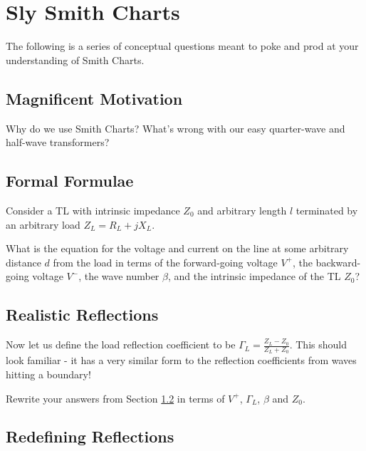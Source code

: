 \documentclass{article}
\begin{document}
\newpage

\section{Sly Smith Charts}
\label{section:smith_chart}

The following is a series of conceptual questions meant to poke and prod at your understanding of Smith Charts.

\subsection{Magnificent Motivation}

Why do we use Smith Charts? What's wrong with our easy quarter-wave and half-wave transformers?

\vspace{3cm}

\subsection{Formal Formulae}
\label{section:formal_formulae}

Consider a TL with intrinsic impedance $Z_0$ and arbitrary length $l$ terminated by an arbitrary load $Z_L = R_L + jX_L$.

What is the equation for the voltage and current on the line at some arbitrary distance $d$ from the load in terms of the forward-going voltage $V^+$, the backward-going voltage $V^-$, the wave number $\beta$, and the intrinsic impedance of the TL $Z_0$?

\vspace{3cm}

\subsection{Realistic Reflections}
\label{section:realistic_reflections}

Now let us define the load reflection coefficient to be $\Gamma_L = \frac{Z_L - Z_0}{Z_L + Z_0}$. This should look familiar - it has a very similar form to the reflection coefficients from waves hitting a boundary!

Rewrite your answers from Section \ref{section:formal_formulae} in terms of $V^+$, $\Gamma_L$, $\beta$ and $Z_0$.

\vspace{3cm}

\subsection{Redefining Reflections}
\label{section:redefining_reflections}
\end{document}
